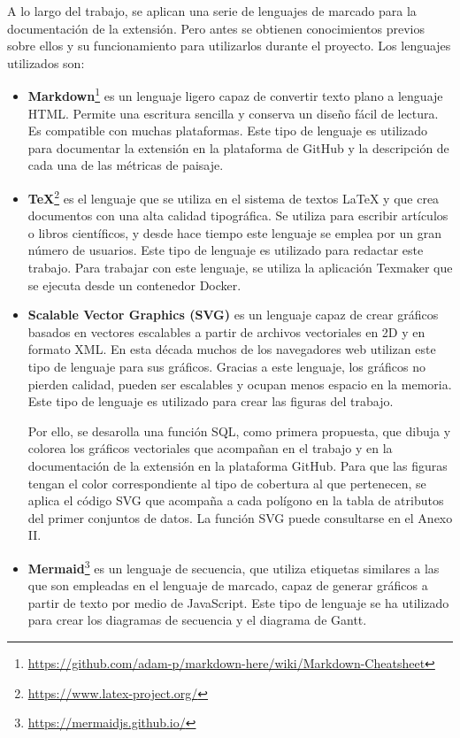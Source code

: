 A lo largo del trabajo, se aplican una serie de lenguajes de marcado para la documentación de la extensión. Pero antes se obtienen conocimientos previos sobre ellos y su funcionamiento para utilizarlos durante el proyecto. Los lenguajes utilizados son:
\begin{itemize}
\item\textbf{Markdown}\footnote{\url{https://github.com/adam-p/markdown-here/wiki/Markdown-Cheatsheet}} es un lenguaje ligero capaz de convertir texto plano a lenguaje HTML. Permite una escritura sencilla y conserva un diseño fácil de lectura. Es compatible con muchas plataformas. Este tipo de lenguaje es utilizado para documentar la extensión en la plataforma de GitHub y la descripción de cada una de las métricas de paisaje.
\item\textbf{TeX}\footnote{\url{https://www.latex-project.org/}} es el lenguaje que se utiliza en el sistema de textos LaTeX y que crea documentos con una alta calidad tipográfica. Se utiliza para escribir artículos o libros científicos, y desde hace tiempo este lenguaje se emplea por un gran número de usuarios. Este tipo de lenguaje es utilizado para redactar este trabajo. Para trabajar con este lenguaje, se utiliza la aplicación Texmaker que se ejecuta desde un contenedor Docker.
\item\textbf{Scalable Vector Graphics (SVG)} es un lenguaje capaz de crear gráficos basados en vectores escalables a partir de archivos vectoriales en 2D y en formato XML. En esta década muchos de los navegadores web utilizan este tipo de lenguaje para sus gráficos. Gracias a este lenguaje, los gráficos no pierden calidad, pueden ser escalables y ocupan menos espacio en la memoria. Este tipo de lenguaje es utilizado para crear las figuras del trabajo.

Por ello, se desarolla una función SQL, como primera propuesta, que dibuja y colorea los gráficos vectoriales que acompañan en el trabajo y en la documentación de la extensión en la plataforma GitHub. Para que las figuras tengan el color correspondiente al tipo de cobertura al que pertenecen, se aplica el código SVG que acompaña a cada polígono en la tabla de atributos del primer conjuntos de datos. La función SVG puede consultarse en el Anexo II.
\item\textbf{Mermaid}\footnote{\url{https://mermaidjs.github.io/}} es un lenguaje de secuencia, que utiliza etiquetas similares a las que son empleadas en el lenguaje de marcado, capaz de generar gráficos a partir de texto por medio de JavaScript. Este tipo de lenguaje se ha utilizado para crear los diagramas de secuencia y el diagrama de Gantt.
\end{itemize}















